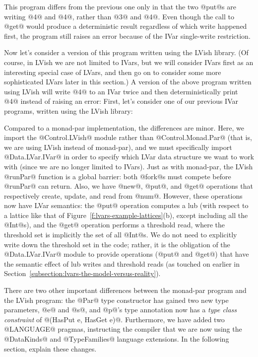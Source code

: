\singlespacing

\doublespacing

This program differs from the previous one only in that the two @put@s
are writing @4@ and @4@, rather than @3@ and @4@.  Even though the
call to @get@ would produce a deterministic result regardless of which
write happened first, the program still raises an error because of the
IVar single-write restriction.

Now let's consider a version of this program written using the LVish
library. (Of course, in LVish we are not limited to IVars, but we
will consider IVars first as an interesting special case of LVars, and
then go on to consider some more sophisticated LVars later in this
section.)  A version of the above program written using LVish will
write @4@ to an IVar twice and then deterministically print @4@
instead of raising an error:
\else
First, let's consider one of our previous IVar programs, written 
using the LVish library:
\fi

\singlespacing

\doublespacing

\ifdefined\JOURNAL
Compared to a monad-par implementation, the differences are minor.
\fi{}
Here, we import the @Control.LVish@ module rather than
@Control.Monad.Par@ (that is, we are using LVish instead of
monad-par), and we must specifically import @Data.LVar.IVar@ in order
to specify which LVar data structure we want to work with (since we
are no longer limited to IVars).  Just as with monad-par, the LVish
@runPar@ function is a global barrier: both @fork@s must compete
before @runPar@ can return.  Also, we have @new@, @put@,
and @get@ operations that respectively create, update, and read from
@num@.  However, these operations now have LVar semantics: the @put@
operation computes a lub (with respect to a lattice like that of
Figure~\ref{f:lvars-example-lattices}(b), except including all the
@Int@s), and the @get@ operation performs a threshold read, where the
threshold set is implicitly the set of all @Int@s.  We do not need to
explicitly write down the threshold set in the code; rather, it is the
obligation of the @Data.LVar.IVar@ module to provide operations (@put@
and @get@) that have the semantic effect of lub writes and threshold
reads (as  touched on earlier in
Section~\ref{subsection:lvars-the-model-versus-reality}).

There are two other important differences between the monad-par
program and the LVish program: the @Par@ type constructor has gained
two new type parameters, @e@ and @s@, and @p@'s type annotation now
has a \emph{type class constraint} of @(HasPut e, HasGet e)@.
Furthermore, we have added two @LANGUAGE@ pragmas, instructing the
compiler that we are now using the @DataKinds@ and @TypeFamilies@
language extensions.  In the following section,  explain these
changes.


